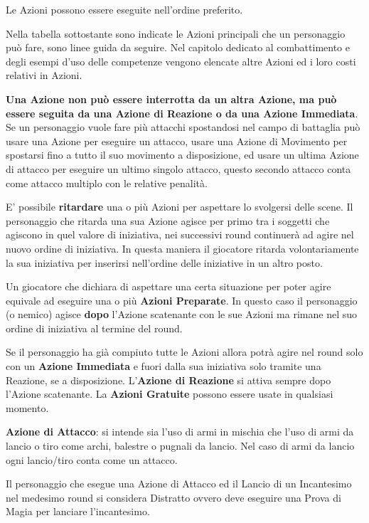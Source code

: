\begin{multicols}{2}
Le Azioni possono essere eseguite nell'ordine preferito.

Nella tabella sottostante sono indicate le Azioni principali che un personaggio può fare, sono linee guida da seguire. Nel capitolo dedicato al combattimento e degli esempi d'uso delle competenze vengono elencate altre Azioni ed i loro costi relativi in Azioni.

\textbf{Una Azione non può essere interrotta da un altra Azione, ma può essere seguita da una Azione di Reazione o da una Azione Immediata}. 
Se un personaggio vuole fare più attacchi spostandosi nel campo di battaglia può usare una Azione per eseguire un attacco, usare una Azione di Movimento per spostarsi fino a tutto il suo movimento a disposizione, ed usare un ultima Azione di attacco per eseguire un ultimo singolo attacco, questo secondo attacco conta come attacco multiplo con le relative penalità.

E' possibile \textbf{ritardare} una o più Azioni per aspettare lo svolgersi delle scene. Il personaggio che ritarda una sua Azione agisce per primo tra i soggetti che agiscono in quel valore di iniziativa, nei successivi round continuerà ad agire nel nuovo ordine di iniziativa. In questa maniera il giocatore ritarda volontariamente la sua iniziativa per inserirsi nell'ordine delle iniziative in un altro posto.

Un giocatore che dichiara di aspettare una certa situazione per poter agire equivale ad eseguire una o più \textbf{Azioni Preparate}. In questo caso il personaggio (o nemico) agisce \textbf{dopo} l'Azione scatenante con le sue Azioni ma rimane nel suo ordine di iniziativa al termine del round.

Se il personaggio ha già compiuto tutte le Azioni allora potrà agire nel round solo con un \textbf{Azione Immediata} e fuori dalla sua iniziativa solo tramite una Reazione, se a disposizione. L'\textbf{Azione di Reazione} si attiva sempre dopo l'Azione scatenante.
La \textbf{Azioni Gratuite} possono essere usate in qualsiasi momento.

\textbf{Azione di Attacco}: si intende sia l'uso di armi in mischia che l'uso di armi da lancio o tiro come archi, balestre o pugnali da lancio. Nel caso di armi da lancio ogni lancio/tiro conta come un attacco.

Il personaggio che esegue una Azione di Attacco ed il Lancio di un Incantesimo nel medesimo round si considera Distratto ovvero deve eseguire una Prova di Magia per lanciare l'incantesimo.


\end{multicols}
